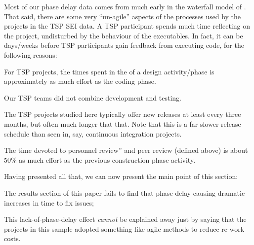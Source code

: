 \item Most of our phase delay data comes from much early in the waterfall model
of .
\ei 
That said, there are some very ``un-agile'' aspects
of the processes used by the   projects in the TSP SEI data.
A TSP participant spends much time reflecting on the project,
undisturbed by the behaviour of the  executables.
In fact,
it can be days/weeks
before TSP participants gain  feedback from executing code, for the following reasons:  
\bi 
\item
For TSP projects, the times spent in the of a design activity/phase is   
approximately as much effort as the coding phase.  
\item Our TSP teams did not
 combine development and  testing. 
 \item  The TSP projects studied here typically offer new releases at least every three months, but
often much longer that that. Note that this is a far slower
release schedule than seen in, say, continuous integration projects.  
\item The time devoted to personnel review'' and peer review (defined above)
is  about 50\% as much effort as the previous construction phase activity.
 
\ei

Having presented all that, we can now present the main point of this section:
\bi 
\item The results section of this paper fails to find that  phase delay causing dramatic increases
in time to fix issues;
\item This lack-of-phase-delay effect {\em cannot} be explained away just by  saying that
the projects in this sample adopted something like  agile methods to reduce re-work costs.
\ei  